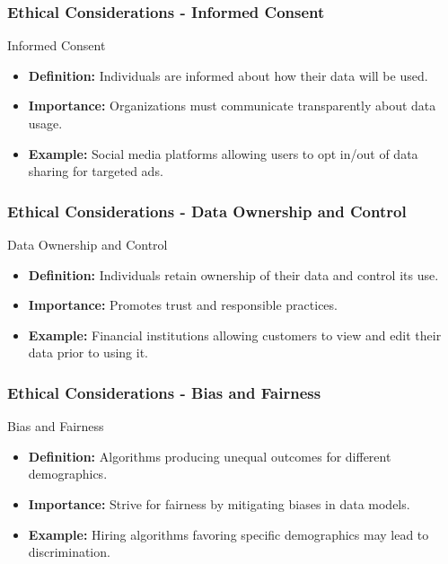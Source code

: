 \documentclass[aspectratio=169]{beamer}
\begin{document}
\begin{frame}[fragile]
    \frametitle{Ethical Considerations - Informed Consent}
    \begin{block}{Informed Consent}
        \begin{itemize}
            \item \textbf{Definition:} Individuals are informed about how their data will be used.
            \item \textbf{Importance:} Organizations must communicate transparently about data usage.
            \item \textbf{Example:} Social media platforms allowing users to opt in/out of data sharing for targeted ads.
        \end{itemize}
    \end{block}
\end{frame}

\begin{frame}[fragile]
    \frametitle{Ethical Considerations - Data Ownership and Control}
    \begin{block}{Data Ownership and Control}
        \begin{itemize}
            \item \textbf{Definition:} Individuals retain ownership of their data and control its use.
            \item \textbf{Importance:} Promotes trust and responsible practices.
            \item \textbf{Example:} Financial institutions allowing customers to view and edit their data prior to using it.
        \end{itemize}
    \end{block}
\end{frame}

\begin{frame}[fragile]
    \frametitle{Ethical Considerations - Bias and Fairness}
    \begin{block}{Bias and Fairness}
        \begin{itemize}
            \item \textbf{Definition:} Algorithms producing unequal outcomes for different demographics.
            \item \textbf{Importance:} Strive for fairness by mitigating biases in data models.
            \item \textbf{Example:} Hiring algorithms favoring specific demographics may lead to discrimination.
        \end{itemize}
    \end{block}
\end{frame}
\end{document}
